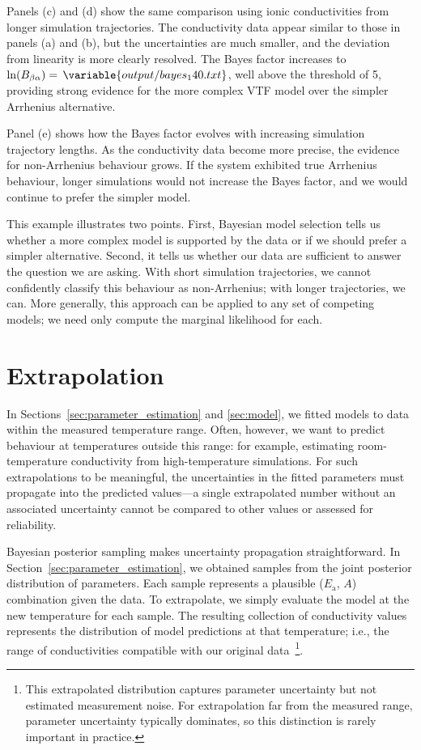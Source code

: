 \documentclass[reprint,superscriptaddress,nobibnotes,nofootinbib,amsmath,amssymb,aps,hidelinks]{revtex4-2}
\newcommand{\Ea}{E_{\mathrm{a}}}
\begin{document}
Panels (c) and (d) show the same comparison using ionic conductivities from longer simulation trajectories.
The conductivity data appear similar to those in panels (a) and (b), but the uncertainties are much smaller, and the deviation from linearity is more clearly resolved.
The Bayes factor increases to $\ln(B_{\beta\alpha}) =\,\variable{output/bayes_140.txt}$, well above the threshold of \num{5}, providing strong evidence for the more complex VTF model over the simpler Arrhenius alternative.

Panel (e) shows how the Bayes factor evolves with increasing simulation trajectory lengths.
As the conductivity data become more precise, the evidence for non-Arrhenius behaviour grows.
If the system exhibited true Arrhenius behaviour, longer simulations would not increase the Bayes factor, and we would continue to prefer the simpler model.

This example illustrates two points. 
First, Bayesian model selection tells us whether a more complex model is supported by the data or if we should prefer a simpler alternative.
Second, it tells us whether our data are sufficient to answer the question we are asking. 
With short simulation trajectories, we cannot confidently classify this behaviour as non-Arrhenius; with longer trajectories, we can.
More generally, this approach can be applied to any set of competing models; we need only compute the marginal likelihood for each.


\section{Extrapolation}
\label{sec:extrapolation}
In Sections~\ref{sec:parameter_estimation} and \ref{sec:model}, we fitted models to data within the measured temperature range. 
Often, however, we want to predict behaviour at temperatures outside this range: for example, estimating room-temperature conductivity from high-temperature simulations. 
For such extrapolations to be meaningful, the uncertainties in the fitted parameters must propagate into the predicted values---a single extrapolated number without an associated uncertainty cannot be compared to other values or assessed for reliability.

Bayesian posterior sampling makes uncertainty propagation straightforward. 
In Section~\ref{sec:parameter_estimation}, we obtained samples from the joint posterior distribution of parameters. 
Each sample represents a plausible ($\Ea$, $A$) combination given the data. 
To extrapolate, we simply evaluate the model at the new temperature for each sample. 
The resulting collection of conductivity values represents the distribution of model predictions at that temperature; i.e., the range of conductivities compatible with our original data~\footnote{This extrapolated distribution captures parameter uncertainty but not estimated measurement noise. For extrapolation far from the measured range, parameter uncertainty typically dominates, so this distinction is rarely important in practice.}.
\end{document}
